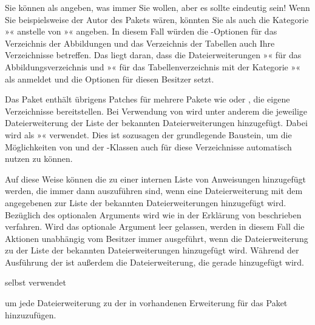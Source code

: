 Sie können als  angeben, was immer Sie wollen, aber es sollte
eindeutig sein! Wenn Sie beispielsweise der Autor des Pakets 
wären, könnten Sie als  auch die Kategorie »«
anstelle von »« angeben. In diesem Fall würden die
\KOMAScript-Optionen%
 für das Verzeichnis der Abbildungen
und das Verzeichnis der Tabellen auch Ihre Verzeichnisse betreffen. Das liegt
daran, dass \KOMAScript{} die Dateierweiterungen »« für das
Abbildungsverzeichnis und »« für das Tabellenverzeichnis mit der
Kategorie »« als  anmeldet und die Optionen für
diesen Besitzer setzt.

Das Paket \hyperref[cha:scrhack]{}%
 enthält übrigens
Patches für mehrere Pakete wie  oder , die
eigene Verzeichnisse bereitstellen. Bei Verwendung von
\hyperref[cha:scrhack]{} wird unter anderem die jeweilige
Dateierweiterung der Liste der bekannten Dateierweiterungen hinzugefügt. Dabei
wird als  »« verwendet. Dies ist sozusagen der
grundlegende Baustein, um die Möglichkeiten von  und der
\KOMAScript-Klassen auch für diese Verzeichnisse automatisch nutzen zu
können.%
\EndIndexGroup


\begin{Declaration}
\end{Declaration}
Auf diese Weise können die  zu einer internen Liste von
Anweisungen hinzugefügt werden, die immer dann auszuführen sind, wenn eine
Dateierweiterung mit dem angegebenen  zur Liste der bekannten
Dateierweiterungen hinzugefügt wird. Bezüglich des optionalen Arguments wird
wie in der Erklärung von  beschrieben
verfahren. Wird das optionale Argument leer gelassen, werden in diesem Fall
die Aktionen unabhängig vom Besitzer immer ausgeführt, wenn die
Dateierweiterung zu der Liste der bekannten Dateierweiterungen hinzugefügt
wird. Während der Ausführung der  ist außerdem
 die
Dateierweiterung, die gerade hinzugefügt wird.
\begin{Example}
   selbst verwendet
\begin{lstcode}
  \AtAddToTocList[]{%
    \expandafter\tocbasic@extend@babel
    \expandafter{\@currext}}
\end{lstcode}
  um jede Dateierweiterung zu der in  vorhandenen
  Erweiterung für das Paket  hinzuzufügen. 
\end{Example}

